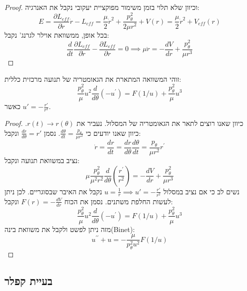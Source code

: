 \documentclass{tstextbook}
\begin{document}
\begin{proof}
וכיוון שלא תלוי בזמן משימור מפוקציית יעקובי נקבל את האנרגיה:
$$ E=\frac{\partial L_{eff}}{\partial\dot{r}}\dot{r}-L_{eff}=\frac{\mu}{2}\dot{r}^2+\frac{p_\theta^2}{2\mu r^2}+V(r)=\boxed{ \frac{\mu}{2}\dot{r}^2+V_{eff}(r) }$$
בכל אופן, ממשוואת אוילר לגרנג' נקבל:
$$ \frac d{dt}\frac{\partial L_{eff}}{\partial\dot{r}}-\frac{\partial L_{eff}}{\partial r}=0\implies \boxed{ \mu\ddot{r}=-\frac{dV}{dr}+\frac{p_\theta^2}{\mu r^3} }$$

\end{proof}
\begin{proposition}
זוהי המשוואה המתארת את הגאומטריה של תנועה מרכזית כללית:
$$ \frac{p_\theta^2}\mu u^2\frac d{d\theta}(-u^{\prime})=F(1/u)+\frac{p_\theta^2}\mu u^3$$
כאשר \(u'=-\frac{r'}{r^{2}}\).

\end{proposition}
\begin{proof}
כיוון שאנו רוצים לתאר את הגאומטריה של המסלול. נעביר את \(r(t)\to r\left( \theta \right)\).
כיוון שאנו יודעים כי \(\frac{d\theta}{dt}=\frac{p_{\theta}}{\mu r^2}\). נסמן \(\frac{dr}{d\theta}=r'\) ונקבל:
$$ \dot{r}=\frac{dr}{dt}=\frac{dr}{d\theta}\frac{d\theta}{dt}=\frac{p_\theta}{\mu r^2}r^{\prime}$$
נציב במשוואת תנועה ונקבל:
$$ \mu\frac{p_\theta^2}{\mu^2r^2}\frac d{d\theta}\left(\frac{r^{\prime}}{r^2}\right)=-\frac{dV}{dr}+\frac{p_\theta^2}{\mu r^3}$$
נשים לב כי אם נציב במסלול \(u=\frac{1}{r}\implies u'=-\frac{r'}{r^2}\) נקבל את האיבר שבסוגריים. לכן ניתן לעשות החלפת משתנים. נסמן את הכוח \(F(r)= -\frac{dV}{dr}\) ונקבל:
$$ \frac{p_\theta^2}\mu u^2\frac d{d\theta}(-u^{\prime})=F(1/u)+\frac{p_\theta^2}\mu u^3$$
מזה ניתן לפשט ולקבל את משוואת בינה(Binet):
$$\boxed{ u^{\prime\prime}+u=-\frac\mu{p_\theta^2u^2}F(1/u)}
$$

\end{proof}
\subsection{בעיית קפלר}
\end{document}
